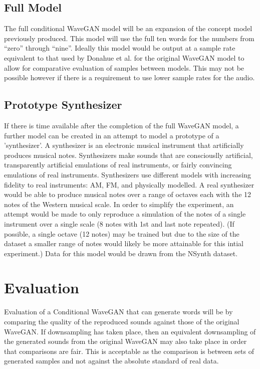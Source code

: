 \documentclass{article}
\begin{document}
\subsection{Full Model}

The full conditional WaveGAN model will be an expansion of the concept model previously produced.
This model will use the full ten words for the numbers from ``zero'' through ``nine''.
Ideally this model would be output at a sample rate equivalent to that used by Donahue et al. for the original WaveGAN model to allow for comparative evaluation of samples between models.
This may not be possible however if there is a requirement to use lower sample rates for the audio.

\subsection{Prototype Synthesizer}

If there is time available after the completion of the full WaveGAN model, a further model can be created in an attempt to model a prototype of a 'synthesizer'.
A synthesizer is an electronic musical instrument that artificially produces musical notes.
Synthesizers make sounds that are consciouslly artificial, transparently artificial emulations of real instruments, or fairly convincing emulations of real instruments.
Synthesizers use different models with increasing fidelity to real instruments: AM, FM, and physically modelled.
\newline
\newline
A real synthesizer would be able to produce musical notes over a range of octaves each with the 12 notes of the Western musical scale.
In order to simplify the experiment, an attempt would be made to only reproduce a simulation of the notes of a single instrument over a single scale (8 notes with 1st and last note repeated).
(If possible, a single octave (12 notes) may be trained but due to the size of the dataset a smaller range of notes would likely be more attainable for this intial experiment.)
\newline
\newline
Data for this model would be drawn from the NSynth dataset.

\section{Evaluation}

Evaluation of a Conditional WaveGAN that can generate words will be by comparing the quality of the reproduced sounds against those of the original WaveGAN.
If downsampling has taken place, then an equivalent downsampling of the generated sounds from the original WaveGAN may also take place in order that comparisons are fair.
This is acceptable as the comparison is between sets of generated samples and not against the absolute standard of real data.
\end{document}
